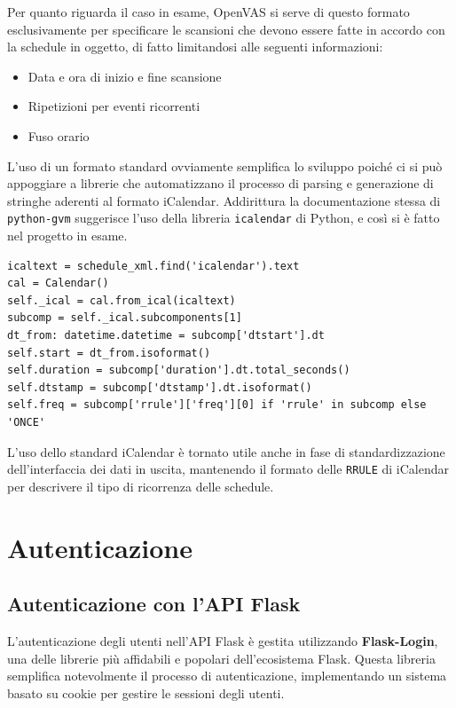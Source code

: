 Per quanto riguarda il caso in esame, OpenVAS si serve di questo formato esclusivamente per specificare le scansioni che devono essere fatte in accordo con la schedule in oggetto, di fatto limitandosi alle seguenti informazioni:
\begin{itemize}
    \item Data e ora di inizio e fine scansione
    \item Ripetizioni per eventi ricorrenti
    \item Fuso orario
\end{itemize}

L'uso di un formato standard ovviamente semplifica lo sviluppo poiché ci si può appoggiare a librerie che automatizzano il processo di parsing e generazione di stringhe aderenti al formato iCalendar. Addirittura la documentazione stessa di \texttt{python-gvm} suggerisce l'uso della libreria \texttt{icalendar} di Python, e così si è fatto nel progetto in esame.

\begin{lstlisting}[caption={Uso di icalendar}]
icaltext = schedule_xml.find('icalendar').text
cal = Calendar()
self._ical = cal.from_ical(icaltext)
subcomp = self._ical.subcomponents[1]
dt_from: datetime.datetime = subcomp['dtstart'].dt
self.start = dt_from.isoformat()
self.duration = subcomp['duration'].dt.total_seconds()
self.dtstamp = subcomp['dtstamp'].dt.isoformat()
self.freq = subcomp['rrule']['freq'][0] if 'rrule' in subcomp else 'ONCE'
\end{lstlisting}

L'uso dello standard iCalendar è tornato utile anche in fase di standardizzazione dell'interfaccia dei dati in uscita, mantenendo il formato delle \texttt{RRULE} di iCalendar per descrivere il tipo di ricorrenza delle schedule.

\section{Autenticazione}
\subsection{Autenticazione con l'API Flask}
L'autenticazione degli utenti nell'API Flask è gestita utilizzando \textbf{Flask-Login}, una delle librerie più affidabili e popolari dell'ecosistema Flask. Questa libreria semplifica notevolmente il processo di autenticazione, implementando un sistema basato su cookie per gestire le sessioni degli utenti.


